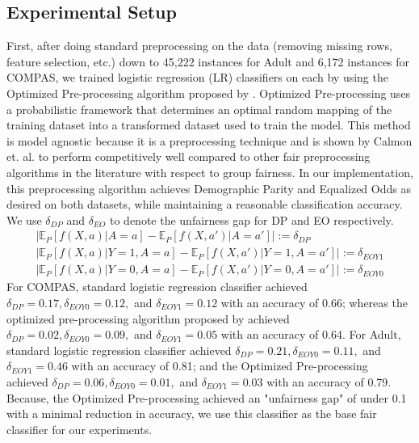 \documentclass[11pt]{article}
\newcommand{\kibitz}[2]{\ifnum\Comments=1{\color{#1}{#2}}\fi}
\newcommand{\dm}[1]{\kibitz{magenta}{[Deb: #1]}}
\newcommand{\E}{\mathbb{E}}
\newcommand{\abs}[1]{\left|#1\right|}
\renewcommand{\cite}{\parencite}
\begin{document}
\subsection{Experimental Setup}
First, after doing standard preprocessing on the data (removing missing rows, feature selection, etc.) down to 45,222 instances for Adult and 6,172 instances for COMPAS,  we trained logistic regression (LR) classifiers on each by using the Optimized Pre-processing algorithm proposed by \citet{CWVN+17}. Optimized Pre-processing uses a probabilistic framework that determines an optimal random mapping of the training dataset into a transformed dataset used to train the model. This method is model agnostic because it is a preprocessing technique and is shown by Calmon et. al. to perform competitively well compared to other fair preprocessing algorithms in the literature with respect to group fairness. In our implementation, this preprocessing algorithm achieves Demographic Parity and Equalized Odds as desired on both datasets, while maintaining a reasonable classification accuracy. We use  $\delta_{DP}$ and $\delta_{EO}$ to denote the unfairness gap for DP and EO respectively.
\begin{align}
    \abs{\E_{P}[f(X,a)|A=a] - \E_P[f(X,a')|A=a']} := \delta_{DP} \\
    \abs{\E_{P}[f(X,a)|Y=1, A=a] - \E_P[f(X,a')|Y=1, A=a']} := \delta_{EOY1} \\
    \abs{\E_{P}[f(X,a)|Y=0, A=a] - \E_P[f(X,a')|Y=0, A=a']} := \delta_{EOY0}
\end{align}
For COMPAS, standard logistic regression classifier achieved $\delta_{DP} = 0.17, \delta_{EOY0} = 0.12,$ and $\delta_{EOY1} = 0.12$ with an accuracy of 0.66; whereas the optimized pre-processing algorithm proposed by \cite{CWVN+17} achieved $\delta_{DP} = 0.02, \delta_{EOY0} = 0.09,$ and $\delta_{EOY1} = 0.05$ with an accuracy of 0.64. For Adult, standard  logistic regression classifier achieved $\delta_{DP} = 0.21, \delta_{EOY0} = 0.11,$ and $\delta_{EOY1} = 0.46$ with an accuracy of 0.81; and the Optimized Pre-processing achieved $\delta_{DP} = 0.06, \delta_{EOY0} = 0.01,$ and $\delta_{EOY1} = 0.03$ with an accuracy of 0.79. Because, the  Optimized Pre-processing achieved an "unfairness gap" of under 0.1 with a minimal reduction in accuracy, we use this classifier as the base fair classifier for our experiments. %
\end{document}
